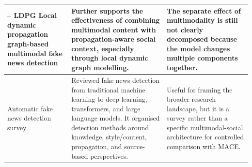 {\begin{longtable}{
>{\raggedright\arraybackslash}p{}
>{\raggedright\arraybackslash}p{}
>{\raggedright\arraybackslash}p{}
}
\midrule

\textbf{\citet{Ji2026LDPG} -- LDPG} \newline
Local dynamic propagation graph-based multimodal fake news detection
&
Further supports the effectiveness of combining multimodal content with propagation-aware social context, especially through local dynamic graph modelling.
&
The separate effect of multimodality is still not clearly decomposed because the model changes multiple components together. \\

\midrule

\textbf{\citet{emil2025autofakenews}} \newline
Automatic fake news detection survey
&
Reviewed fake news detection from traditional machine learning to deep learning, transformers, and large language models. It organised detection methods around knowledge, style/content, propagation, and source-based perspectives.
&
Useful for framing the broader research landscape, but it is a survey rather than a specific multimodal-social architecture for controlled comparison with MACE. \\

\end{longtable}
}

